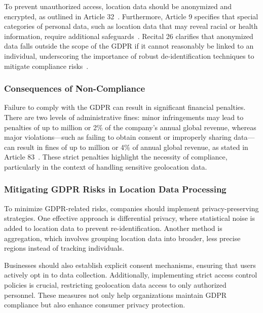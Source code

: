 \documentclass[twocolumn]{article}
\begin{document}
To prevent unauthorized access, location data should be anonymized and encrypted, as outlined in Article 32~\cite{article32_gdpr}. Furthermore, Article 9 specifies that special categories of personal data, such as location data that may reveal racial or health information, require additional safeguards~\cite{article9_gdpr}. Recital 26 clarifies that anonymized data falls outside the scope of the GDPR if it cannot reasonably be linked to an individual, underscoring the importance of robust de-identification techniques to mitigate compliance risks~\cite{recital26_gdpr}.  

\subsubsection{Consequences of Non-Compliance}

Failure to comply with the GDPR can result in significant financial penalties. There are two levels of administrative fines: minor infringements may lead to penalties of up to  million or 2\% of the company’s annual global revenue, whereas major violations—such as failing to obtain consent or improperly sharing data—can result in fines of up to  million or 4\% of annual global revenue, as stated in Article 83~\cite{article83_gdpr}. These strict penalties highlight the necessity of compliance, particularly in the context of handling sensitive geolocation data.  

\subsubsection{Mitigating GDPR Risks in Location Data Processing}

To minimize GDPR-related risks, companies should implement privacy-preserving strategies. One effective approach is differential privacy, where statistical noise is added to location data to prevent re-identification. Another method is aggregation, which involves grouping location data into broader, less precise regions instead of tracking individuals.  

Businesses should also establish explicit consent mechanisms, ensuring that users actively opt in to data collection. Additionally, implementing strict access control policies is crucial, restricting geolocation data access to only authorized personnel. These measures not only help organizations maintain GDPR compliance but also enhance consumer privacy protection.  
\end{document}
